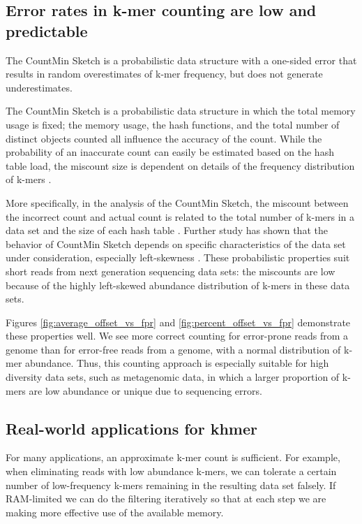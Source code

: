 \documentclass[10pt]{article}
\begin{document}

\subsection*{Error rates in k-mer counting are low and predictable}

The CountMin Sketch is a probabilistic data structure with a one-sided
error that results in random overestimates of k-mer frequency, but
does not generate underestimates.

The CountMin Sketch is a probabilistic data structure in which the
total memory usage is fixed; the memory usage, the hash functions, and
the total number of distinct objects counted all influence the
accuracy of the count.  While the probability of an inaccurate count
can easily be estimated based on the hash table load, the miscount
size is dependent on details of the frequency distribution of k-mers
\cite{Cormode2005}.

More specifically, in the analysis of the CountMin Sketch, the
miscount between the incorrect count and actual count is related to
the total number of k-mers in a data set and the size of each hash
table \cite{Cormode2005}. Further study has shown that the behavior of
CountMin Sketch depends on specific characteristics of the data set
under consideration, especially left-skewness \cite{Rusu2008,
  CormodeM05}.  These probabilistic properties suit short reads from
next generation sequencing data sets: the miscounts are low because of
the highly left-skewed abundance distribution of k-mers in these data
sets.

Figures \ref{fig:average_offset_vs_fpr} and
\ref{fig:percent_offset_vs_fpr} demonstrate these properties well.  We
see more correct counting for error-prone reads from a genome than for
error-free reads from a genome, with a normal distribution of k-mer
abundance.  Thus, this counting approach is especially suitable for
high diversity data sets, such as metagenomic data, in which a larger
proportion of k-mers are low abundance or unique due to sequencing
errors.

\subsection*{Real-world applications for khmer}

For many applications, an approximate k-mer count is sufficient.  For
example, when eliminating reads with low abundance k-mers, we can
tolerate a certain number of low-frequency k-mers remaining in the
resulting data set falsely.  If RAM-limited we can do the filtering
iteratively so that at each step we are making more effective use of
the available memory.
\end{document}
